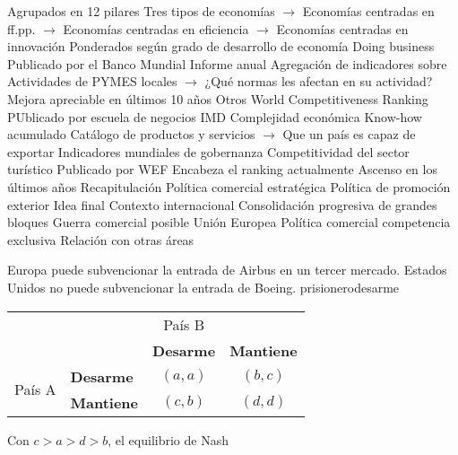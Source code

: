 \documentclass{nuevotema}
\begin{document}
\begin{esquemal}
				\4[] Agrupados en 12 pilares
				\4[] Tres tipos de economías
				\4[] $\to$ Economías centradas en ff.pp.
				\4[] $\to$ Economías centradas en eficiencia
				\4[] $\to$ Economías centradas en innovación
				\4[] Ponderados según grado de desarrollo de economía
			\3 Doing business
				\4 Publicado por el Banco Mundial
				\4 Informe anual
				\4 Agregación de indicadores sobre
				\4[] Actividades de PYMES locales
				\4[] $\to$ ¿Qué normas les afectan en su actividad?
				\4 Mejora apreciable en últimos 10 años
			\3 Otros
				\4 World Competitiveness Ranking
				\4[] PUblicado por escuela de negocios IMD
				\4 Complejidad económica
				\4[] Know-how acumulado
				\4[] Catálogo de productos y servicios
				\4[] $\to$ Que un país es capaz de exportar
				\4 Indicadores mundiales de gobernanza
				\4 Competitividad del sector turístico
				\4[] Publicado por WEF
				\4[] Encabeza el ranking actualmente
				\4[] Ascenso en los últimos años
	\1[] 
		\2 Recapitulación
			\3 Política comercial estratégica
			\3 Política de promoción exterior
		\2 Idea final
			\3 Contexto internacional
				\4 Consolidación progresiva de grandes bloques
				\4 Guerra comercial posible
			\3 Unión Europea
				\4 Política comercial competencia exclusiva
				\4
			\3 Relación con otras áreas
\end{esquemal}




\graficas 

\begin{tabla}{Europa puede subvencionar la entrada de Airbus en un tercer mercado. Estados Unidos no puede subvencionar la entrada de Boeing. }{prisionerodesarme}

	\begin{tabular}{c || l | c | c}
		& \multicolumn{3}{c}{País B} \\ 
		& & \textbf{Desarme} & \textbf{Mantiene} \\ \hline \hline
	\multirow{2}{*}{País A} &\textbf{Desarme} & $(a,a)$ & $(b,c)$  \\ 
			& \textbf{Mantiene} & $(c,b)$ & \textbf{$(d,d)$} \\ \hline
	\end{tabular} 
	Con $c>a>d>b$, el equilibrio de Nash
\medskip
\end{tabla}
\end{document}

